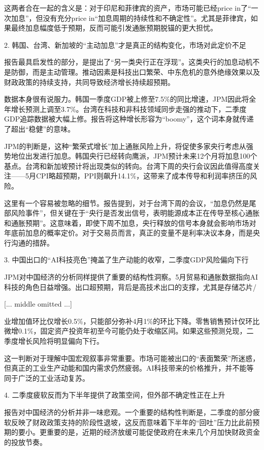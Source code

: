 \documentclass[11pt]{ctexart}
\begin{document}
这两者合在一起的含义是：对于印尼和菲律宾的资产，市场可能已经price in了“一次加息”，但没有充分price in“加息周期的持续性和不确定性”。尤其是菲律宾，如果最终加息幅度低于预期，反而可能引发通胀预期脱锚的更大担忧。

2. 韩国、台湾、新加坡的“主动加息”才是真正的结构变化，市场对此定价不足

报告最具启发性的部分，是提出了“另一类央行正在浮现”。这类央行的加息动机不是防御，而是主动管理。推动因素是科技出口繁荣、中东危机的意外绝缘效果以及财政政策的持续支持，共同导致经济增长持续超预期。

数据本身很有说服力。韩国一季度GDP被上修至7.5\%的同比增速，JPM因此将全年增长预测上调至3.7\%。台湾在科技和非科技领域同步走强的推动下，二季度GDP追踪数据被大幅上修。报告将这种增长形容为“boomy”，这个词本身就传递了超出“稳健”的意味。

JPM的判断是，这种“繁荣式增长”加上通胀风险上升，将促使多家央行考虑从强势地位出发进行加息。韩国央行已经转向鹰派，JPM预计未来12个月将加息100个基点。台湾和新加坡预计将出现类似的转向。台湾下周的央行会议因此值得高度关注——5月CPI略超预期，PPI则飙升14.1\%，这带来了成本传导和利润率挤压的风险。

这里有一个容易被忽略的细节。报告提到，对于台湾下周的会议，“加息仍然是尾部风险事件”，但关键在于“央行是否发出信号，表明能源成本正在传导至核心通胀和通胀预期”。这意味着，即使下周不加息，央行释放的信号本身就会影响市场对年底前加息的概率定价。对于交易员而言，真正的变量不是利率决议本身，而是央行沟通的措辞。

3. 中国出口的“AI科技亮色”掩盖了生产动能的收窄，二季度GDP风险偏向下行

JPM对中国经济的分析同样提供了重要的结构性洞察。5月贸易和通胀数据指向AI科技的角色日益增强。出口超预期，背后是高技术出口的支撑，尤其是存储芯片/

[... middle omitted ...]

业增加值环比仅增长0.5\%，只能部分弥补4月1\%的环比下降。零售销售预计仅环比微增0.1\%，固定资产投资年初至今可能仍处于收缩区间。如果这些预测兑现，二季度增长风险将明显偏向下行。

这一判断对于理解中国宏观叙事非常重要。市场可能被出口的“表面繁荣”所迷惑，但真正的工业生产动能和国内需求仍然疲弱。AI科技带来的价格推升，并不能等同于广泛的工业活动复苏。

4. 二季度疲软反而为下半年提供了政策空间，但外部不确定性正在上升

报告对中国经济的分析并非一味悲观。一个重要的结构性判断是，二季度的部分疲软反映了财政政策支持的阶段性退坡，这反而意味着下半年的“回吐”压力比此前预期的要小。更重要的是，近期的经济放缓可能促使政府在未来几个月加快财政资金的投放节奏。
\end{document}
